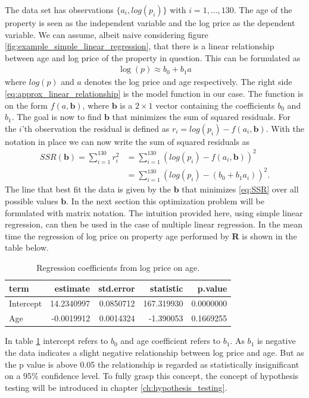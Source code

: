 The data set has observations $\{a_i, log(p_i)\}$ with $i = 1, \ldots, 130$. 
The age of the property is seen as the independent variable and the log price as the dependent variable.
We can assume, albeit naive considering figure \ref{fig:example_simple_linear_regression}, that there is a linear relationship between age and log price of the property in question.
This can be formulated as
\begin{align}\label{eq:approx_linear_relationship}
    \log(p) \approx b_0 + b_1 a
\end{align}
where $log(p)$ and $a$ denotes the log price and age respectively.
The right side \eqref{eq:approx_linear_relationship} is the model function in our case.
The function is on the form $f(a, \textbf{b})$, where $\textbf{b}$ is a $2 \times 1$ vector containing the coefficients $b_0$ and $b_1$.
The goal is now to find $\textbf{b}$ that minimizes the sum of squared residuals.
For the $i$'th observation the residual is defined as $r_i = log(p_i) - f(a_i, \textbf{b})$.
With the notation in place we can now write the sum of squared residuals as
\begin{align}
  SSR(\textbf{b}) = \sum_{i = 1}^{130} r_i^2 &= \sum_{i = 1}^{130} \left( log(p_i) - f(a_i, \textbf{b}) \right)^2 \nonumber\\
  &= \sum_{i = 1}^{130} \left( log(p_i) - (b_0 + b_1 a_i) \right)^2.\label{eq:SSR}
\end{align}
The line that best fit the data is given by the $\textbf{b}$ that minimizes \eqref{eq:SSR} over all possible values $\textbf{b}$.
In the next section this optimization problem will be formulated with matrix notation.
The intuition provided here, using simple linear regression, can then be used in the case of multiple linear regression.
In the mean time the regression of log price on property age performed by \textbf{R} is shown in the table below.
\begin{table}[H]
    \centering
    \begin{tabular}{lrrrr}
        \toprule
        \textbf{term} & \textbf{estimate} & \textbf{std.error} & \textbf{statistic} & \textbf{p.value}\\
        \midrule
        Intercept & 14.2340997 & 0.0850712 & 167.319930 & 0.0000000\\
        Age & -0.0019912 & 0.0014324 & -1.390053 & 0.1669255\\
        \bottomrule
    \end{tabular}
    \caption{Regression coefficients from log price on age.}
    \label{tab:regress_log_price_on_age}
\end{table}
In table \ref{tab:regress_log_price_on_age} intercept refers to $b_0$ and age coefficient refers to $b_1$.
As $b_1$ is negative the data indicates a slight negative relationship between log price and age.
But as the p value is above 0.05 the relationship is regarded as statistically insignificant on a 95\% confidence level.
To fully grasp this concept, the concept of hypothesis testing will be introduced in chapter \ref{ch:hypothesis_testing}.

